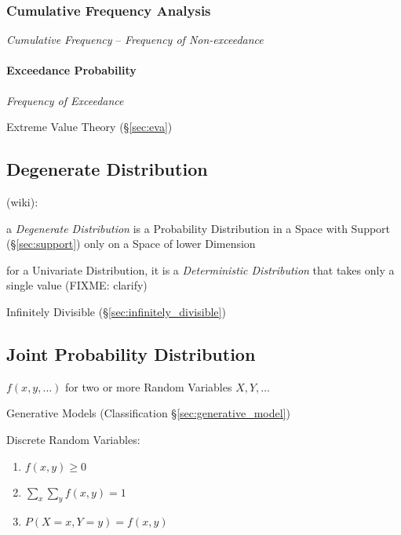 \subsubsection{Cumulative Frequency Analysis}
\label{sec:cumulative_frequency_analysis}

\emph{Cumulative Frequency} -- \emph{Frequency of Non-exceedance}



\paragraph{Exceedance Probability}\label{sec:exceedance_probability}\hfill

\emph{Frequency of Exceedance}

Extreme Value Theory (\S\ref{sec:eva})



\subsection{Degenerate Distribution}\label{sec:degenerate_distribution}

(wiki):

a \emph{Degenerate Distribution} is a Probability Distribution in a Space with
Support (\S\ref{sec:support}) only on a Space of lower Dimension

for a Univariate Distribution, it is a \emph{Deterministic Distribution} that
takes only a single value (FIXME: clarify)

Infinitely Divisible (\S\ref{sec:infinitely_divisible})



\subsection{Joint Probability Distribution}\label{sec:joint_probability}

$f(x,y,\ldots)$ for two or more Random Variables $X,Y,\ldots$

\fist Generative Models (Classification \S\ref{sec:generative_model})

Discrete Random Variables:
\begin{enumerate}
  \item $f(x,y) \geq 0$
  \item $\sum_x \sum_y f(x,y) = 1$
  \item $P(X = x, Y = y) = f(x,y)$
\end{enumerate}

